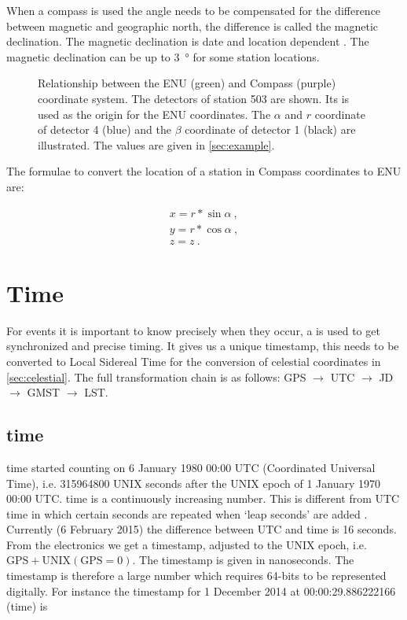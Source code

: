 When a compass is used the angle needs to be compensated for the
difference between magnetic and geographic north, the difference is
called the magnetic declination. The magnetic declination is date and
location dependent \cite{canada:2013aa}. The magnetic declination can be
up to \SI{3}{\degree} for some \hisparc station locations.

\begin{figure}
    \centering
    
    \caption{Relationship between the ENU (green) and Compass (purple)
             coordinate system. The detectors of station 503 are shown.
             Its \gps is used as the origin for the ENU coordinates. The
             $\alpha$ and $r$ coordinate of detector 4 (blue) and the
             $\beta$ coordinate of detector 1 (black) are illustrated.
             The values are given in \cref{sec:example}.}
    \label{fig:enu_compass}
\end{figure}

The formulae to convert the location of a station in Compass coordinates
to ENU are:

\begin{equation}
    \begin{array}{l}
        x = r * \sin{\alpha} \ , \\
        y = r * \cos{\alpha} \ , \\
        z = z \ .
    \end{array}
\end{equation}


\section{Time}
\label{sec:time}

For \hisparc events it is important to know precisely when they occur, a
\gps is used to get synchronized and precise timing. It gives us a
unique timestamp, this needs to be converted to Local Sidereal Time for
the conversion of celestial coordinates in \cref{sec:celestial}. The
full transformation chain is as follows: GPS $\to$ UTC $\to$ JD $\to$
GMST $\to$ LST.


\subsection{\gps time}

\gps time started counting on 6 January 1980 00:00 UTC (Coordinated
Universal Time), i.e. \num{315964800} UNIX seconds after the UNIX epoch
of 1 January 1970 00:00 UTC. \gps time is a continuously increasing
number. This is different from UTC time in which certain seconds are
repeated when `leap seconds' are added \cite{usno:2012aa}. Currently (6
February 2015) the difference between UTC and \gps time is 16 seconds.
From the \hisparc electronics we get a \gps timestamp, adjusted to the
UNIX epoch, i.e. $\mathrm{GPS} + \mathrm{UNIX(GPS=0)}$. The timestamp is
given in nanoseconds. The \gps timestamp is therefore a large number
which requires 64-bits to be represented digitally. For instance the
\gps timestamp for 1 December 2014 at 00:00:29.886222166 (\gps time) is

